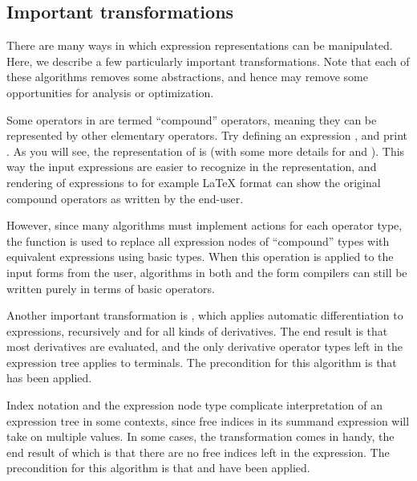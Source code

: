 \subsection{Important transformations} \label{ufl:sec:expanding}

There are many ways in which expression representations can be
manipulated.  Here, we describe a few particularly important
transformations.  Note that each of these algorithms removes some
abstractions, and hence may remove some opportunities for analysis or
optimization.

Some operators in \ufl{} are termed ``compound'' operators, meaning
they can be represented by other elementary operators.  Try defining
an expression , and print
. As you will see, the representation of  is
 (with some more details for 
and ).  This way the input expressions are easier to
recognize in the representation, and rendering of expressions to for
example \LaTeX{} format can show the original compound operators as
written by the end-user.

However, since many algorithms must implement actions for each
operator type, the function  is used to
replace all expression nodes of ``compound'' types with equivalent
expressions using basic types. When this operation is applied to the
input forms from the user, algorithms in both \ufl{} and the form
compilers can still be written purely in terms of basic operators.

Another important transformation is , which
applies automatic differentiation to expressions, recursively and for
all kinds of derivatives.  The end result is that most derivatives are
evaluated, and the only derivative operator types left in the
expression tree applies to terminals. The precondition for this
algorithm is that  has been applied.

Index notation and the  expression node type
complicate interpretation of an expression tree in some contexts,
since free indices in its summand expression will take on multiple
values.  In some cases, the transformation 
comes in handy, the end result of which is that there are no free
indices left in the expression.  The precondition for this algorithm
is that  and  have
been applied.

